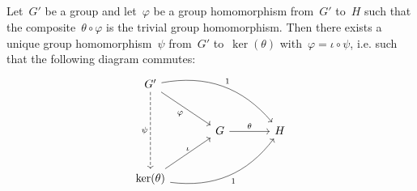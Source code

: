 \subsection{}

Let~$G'$ be a group and let~$\varphi$ be a group homomorphism from~$G'$ to~$H$ such that the composite~$\theta \circ \varphi$ is the trivial group homomorphism.
Then there exists a unique group homomorphism~$\psi$ from~$G'$ to~$\ker(\theta)$ with~$\varphi = \iota \circ \psi$, i.e. such that the following diagram commutes:
\[
	\begin{tikzcd}[sep = large]
		G'
		\arrow{dr}[below left]{\varphi}
		\arrow[bend left]{drr}[above right]{1}
		\arrow[dashed]{dd}[left]{\psi}
		&
		{}
		&
		{}
		\\
		{}
		&
		G
		\arrow{r}[above]{\theta}
		&
		H
		\\
		\ker(\theta)
		\arrow{ur}[above]{\iota}
		\arrow[bend right]{urr}[below right]{1}
		&
		{}
		&
		{}
	\end{tikzcd}
\]
